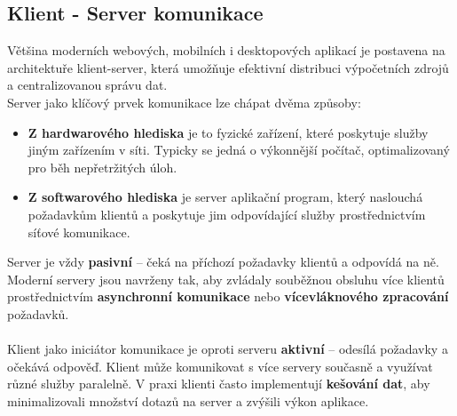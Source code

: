 \subsection{Klient - Server komunikace}

Většina moderních webových, mobilních i desktopových aplikací je postavena na architektuře klient-server, která umožňuje efektivní distribuci výpočetních zdrojů a centralizovanou správu dat. \\
Server jako klíčový prvek komunikace lze chápat dvěma způsoby:
\begin{itemize}
    \item \textbf{Z hardwarového hlediska} je to fyzické zařízení, které poskytuje služby jiným zařízením v síti. Typicky se jedná o výkonnější počítač, optimalizovaný pro běh nepřetržitých úloh.
    \item \textbf{Z softwarového hlediska} je server aplikační program, který naslouchá požadavkům klientů a poskytuje jim odpovídající služby prostřednictvím síťové komunikace.
\end{itemize}
Server je vždy \textbf{pasivní} – čeká na příchozí požadavky klientů a odpovídá na ně. Moderní servery jsou navrženy tak, aby zvládaly souběžnou obsluhu více klientů prostřednictvím \textbf{asynchronní komunikace} nebo \textbf{vícevláknového zpracování} požadavků.\\\\
Klient jako iniciátor komunikace je oproti serveru \textbf{aktivní} – odesílá požadavky a očekává odpověď. Klient může komunikovat s více servery současně a využívat různé služby paralelně. V praxi klienti často implementují \textbf{kešování dat}, aby minimalizovali množství dotazů na server a zvýšili výkon aplikace.

